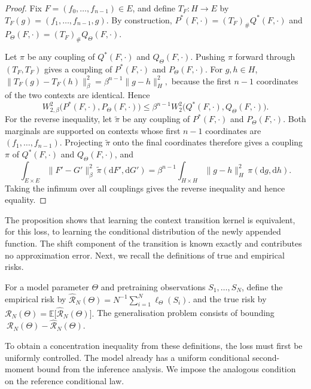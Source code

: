 \begin{proof}
Fix \(F=(f_0,\ldots,f_{n-1})\in E\), and define \(T_F:H\to E\) by
\(
T_F(g)=(f_1,\ldots,f_{n-1},g).
\)
By construction,
\(
P^*(F,\cdot)=(T_F)_\#Q^*(F,\cdot)\) and 
\(
P_\Theta(F,\cdot)=(T_F)_\#Q_\Theta(F,\cdot).
\)

Let \(\pi\) be any coupling of \(Q^*(F,\cdot)\) and \(Q_\Theta(F,\cdot)\). Pushing \(\pi\) forward through \((T_F,T_F)\) gives a coupling of \(P^*(F,\cdot)\) and \(P_\Theta(F,\cdot)\). For \(g,h\in H\),
\(
\|T_F(g)-T_F(h)\|_\beta^2
=
\beta^{n-1}\|g-h\|_H^2,
\)
because the first \(n-1\) coordinates of the two contexts are identical. Hence
\[
W_{2,\beta}^2
\bigl(
P^*(F,\cdot),
P_\Theta(F,\cdot)
\bigr)
\leqslant
\beta^{n-1}
W_2^2
\bigl(
Q^*(F,\cdot),
Q_\Theta(F,\cdot)
\bigr).
\]
For the reverse inequality, let \(\widetilde\pi\) be any coupling of \(P^*(F,\cdot)\) and \(P_\Theta(F,\cdot)\). Both marginals are supported on contexts whose first \(n-1\) coordinates are \((f_1,\ldots,f_{n-1})\). Projecting \(\widetilde\pi\) onto the final coordinates therefore gives a coupling \(\pi\) of \(Q^*(F,\cdot)\) and \(Q_\Theta(F,\cdot)\), and
\[
\int_{E\times E}\|F'-G'\|_\beta^2\,\widetilde\pi(\mathrm dF',\mathrm dG')
=
\beta^{n-1}
\int_{H\times H}\|g-h\|_H^2\,\pi(\mathrm dg,\mathrm dh).
\]
Taking the infimum over all couplings gives the reverse inequality and hence equality.
\end{proof}

The proposition shows that learning the context transition kernel is equivalent, for this loss, to learning the conditional distribution of the newly appended function. The shift component of the transition is known exactly and contributes no approximation error.
Next, we recall the definitions of true and empirical risks.

\begin{definition}[Risk]
\label{def:Empirical and population transition risks}
For a model parameter \(\Theta\) and pretraining observations \(S_1,\ldots,S_N\), define the empirical risk by
\(
\widehat{\mathcal R}_N(\Theta)
=
N^{-1}\sum_{i=1}^N\ell_\Theta(S_i).
\) and the true risk by
\(
\mathcal R_N(\Theta)
=
\mathbb E
\bigl[
\widehat{\mathcal R}_N(\Theta)
\bigr].
\) The generalisation problem consists of bounding \(\ \mathcal R_N(\Theta) - \widehat{\mathcal R}_N(\Theta) \).
\end{definition}

To obtain a concentration inequality from these definitions, the loss must first be uniformly controlled. The model already has a uniform conditional second-moment bound from the inference analysis. We impose the analogous condition on the reference conditional law.

